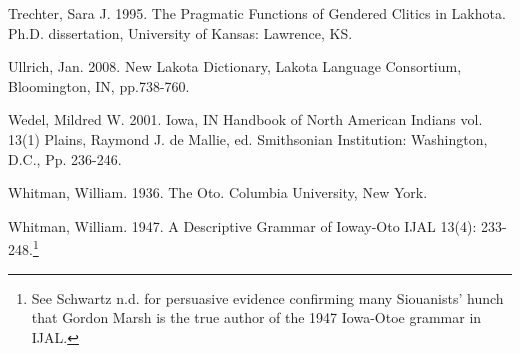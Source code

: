 \documentclass[output=paper]{LSP/langsci}
\begin{document}
\begin{reflist}
Trechter, Sara J.  1995.  The Pragmatic Functions of Gendered Clitics in Lakhota.  Ph.D. dissertation,  University of Kansas: Lawrence, KS.  			  				 
 
Ullrich, Jan. 2008. New Lakota Dictionary, Lakota Language Consortium, Bloomington, IN, pp.738-760.  
 
Wedel, Mildred W.  2001. Iowa, IN Handbook of North American Indians vol. 13(1) Plains,  Raymond J. de Mallie, ed.  Smithsonian Institution:  Washington, D.C., Pp. 236-246. 
 
Whitman, William. 1936.  The Oto.  Columbia University, New York. 	       	         
 
Whitman, William. 1947.  A Descriptive Grammar of Ioway-Oto IJAL 13(4): 233-248.\footnote{See Schwartz n.d. for persuasive evidence confirming many Siouanists' hunch that Gordon Marsh is the true author of the 1947 Iowa-Otoe grammar in IJAL.}

\end{reflist}
\end{document}
